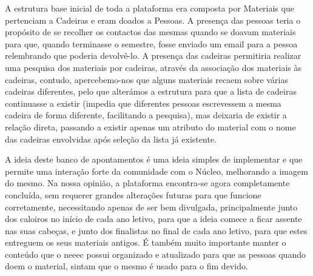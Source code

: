 A estrutura base inicial de toda a plataforma era composta por Materiais que pertenciam a Cadeiras e eram doados a Pessoas. A presença das pessoas teria o propósito de se recolher os contactos das mesmas quando se doavam materiais para que, quando terminasse o semestre, fosse enviado um email para a pessoa relembrando que poderia devolvê-lo. A presença das cadeiras permitiria realizar uma pesquisa dos materiais por cadeiras, através da associação dos materiais às cadeiras, contudo, apercebemo-nos que alguns materiais recaem sobre várias cadeiras diferentes, pelo que alterámos a estrutura para que a lista de cadeiras continuasse a existir (impedia que diferentes pessoas escrevessem a mesma cadeira de forma diferente, facilitando a pesquisa), mas deixaria de existir a relação direta, passando a existir apenas um atributo do material com o nome das cadeiras envolvidas após seleção da lista já existente.

A ideia deste banco de apontamentos é uma ideia simples de implementar e que permite uma interação forte da comunidade com o Núcleo, melhorando a imagem do mesmo. Na nossa opinião, a plataforma encontra-se agora completamente concluída, sem requerer grandes alterações futuras para que funcione corretamente, necessitando apenas de ser bem divulgada, principalmente junto dos caloiros no início de cada ano letivo, para que a ideia comece a ficar assente nas suas cabeças, e junto dos finalistas no final de cada ano letivo, para que estes entreguem os seus materiais antigos. É também muito importante manter o conteúdo que o \acrshort{neeec} possui organizado e atualizado para que as pessoas quando doem o material, sintam que o mesmo é usado para o fim devido.